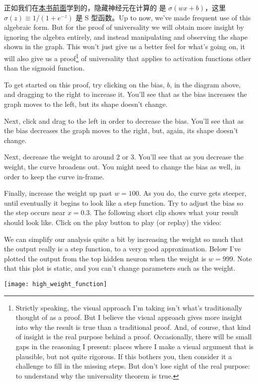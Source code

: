 正如我们在\hyperref[sec:sigmoid_neurons]{本书前面}学到的，隐藏神经元在计算的
是 $\sigma(wx + b)$，这里 $\sigma(z) \equiv 1/(1+e^{-z})$ 是 S 型函数。Up to
now, we've made frequent use of this algebraic form. But for the proof of
universality we will obtain more insight by ignoring the algebra entirely, and
instead manipulating and observing the shape shown in the graph. This won't just
give us a better feel for what's going on, it will also give us a
proof\footnote{ Strictly speaking, the visual approach I'm taking isn't what's
  traditionally thought of as a proof. But I believe the visual approach gives
  more insight into why the result is true than a traditional proof. And, of
  course, that kind of insight is the real purpose behind a proof. Occasionally,
  there will be small gaps in the reasoning I present: places where I make a
  visual argument that is plausible, but not quite rigorous. If this bothers
  you, then consider it a challenge to fill in the missing steps. But don't lose
  sight of the real purpose: to understand why the universality theorem is
  true.} of universality that applies to activation functions other than the
sigmoid function.

To get started on this proof, try clicking on the bias, $b$, in the diagram
above, and dragging to the right to increase it. You'll see that as the bias
increases the graph moves to the left, but its shape doesn't change.

Next, click and drag to the left in order to decrease the bias. You'll see that
as the bias decreases the graph moves to the right, but, again, its shape
doesn't change.

Next, decrease the weight to around $2$ or $3$. You'll see that as you decrease
the weight, the curve broadens out. You might need to change the bias as well,
in order to keep the curve in-frame.

Finally, increase the weight up past $w = 100$. As you do, the curve gets
steeper, until eventually it begins to look like a step function. Try to adjust
the bias so the step occurs near $x = 0.3$. The following short clip shows what
your result should look like. Click on the play button to play (or replay) the
video:


We can simplify our analysis quite a bit by increasing the weight so much that
the output really is a step function, to a very good approximation. Below I've
plotted the output from the top hidden neuron when the weight is $w = 999$. Note
that this plot is static, and you can't change parameters such as the weight.
\begin{center}
  \texttt{[image: high\_weight\_function]}
\end{center}

